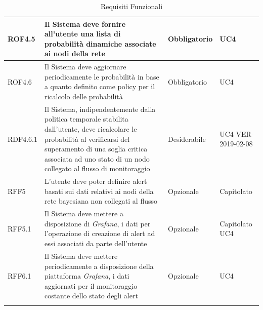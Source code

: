 \begin{center}
\begin{longtable}[c]{|m{}|m{}|m{}|m{}|}
\hline
ROF4.5 & Il Sistema deve fornire all'utente una lista di probabilità dinamiche associate ai nodi della rete & Obbligatorio & UC4\\
\hline
\rowcolor{grigio}ROF4.6 & Il Sistema deve aggiornare periodicamente le probabilità in base a quanto definito come policy per il ricalcolo delle probabilità & Obbligatorio & UC4\\
\hline
RDF4.6.1 & Il Sistema, indipendentemente dalla politica temporale stabilita dall'utente, deve ricalcolare le probabilità al verificarsi del superamento di una soglia critica associata ad uno stato di un nodo collegato al flusso di monitoraggio & Desiderabile & UC4 VER-2019-02-08\\
\hline
\rowcolor{grigio}RFF5 & L'utente deve poter definire alert basati sui dati relativi ai nodi della rete bayesiana non collegati al flusso & Opzionale & Capitolato\\
\hline
RFF5.1 & Il Sistema deve mettere a disposizione di \textit{Grafana}, i dati per l'operazione di creazione di alert ad essi associati da parte dell'utente & Opzionale & Capitolato UC4\\
\hline
\rowcolor{grigio}RFF6.1 & Il Sistema deve mettere periodicamente a disposizione della piattaforma \textit{Grafana}, i dati aggiornati per il monitoraggio costante dello stato degli alert & Opzionale & UC4\\
\hline
\caption{Requisiti Funzionali}
\end{longtable}
\end{center}


